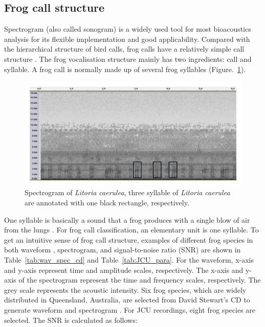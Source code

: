 \subsection{Frog call structure}
Spectrogram (also called sonogram) is a widely used tool for most bioacoustics analysis for its flexible implementation and good applicability. Compared with the hierarchical structure of bird calls, frog calls have a relatively simple call structure \citep{somervuo2006parametric}. The frog vocalisation structure mainly has two ingredients: call and syllable. A frog call is normally made up of several frog syllables (Figure.~\ref{fig:Ch1_spec_mark}).

\begin{figure}[htb!]
\centering
\includegraphics[width=\textwidth]{image/spectrogram_mark.pdf}
\caption[Spectrogram of \textit{Litoria caerulea}]{Spectrogram of \textit{Litoria caerulea}, three syllable of \textit{Litoria caerulea} are annotated with one black rectangle, respectively.}
\label{fig:Ch1_spec_mark}
\end{figure}




One syllable is basically a sound that a frog produces with a single blow of air from the lungs \citep{huang2009frog}. For frog call classification, an elementary unit is one syllable. To get an intuitive sense of frog call structure, examples of different frog species in both waveform , spectrogram, and signal-to-noise ratio (SNR) are shown in Table~\ref{tab:wav_spec_cd} and Table~\ref{tab:JCU_para}. For the waveform, x-axis and y-axis represent time and amplitude scales, respectively. The x-axis and y-axis of the spectrogram represent the time and frequency scales, respectively. The grey scale represents the acoustic intensity. Six frog species, which are widely distributed in Queensland, Australia, are selected from David Stewart's CD to generate waveform and spectrogram \citep{CD}. For JCU recordings, eight frog species are selected. The SNR is calculated as follows:

